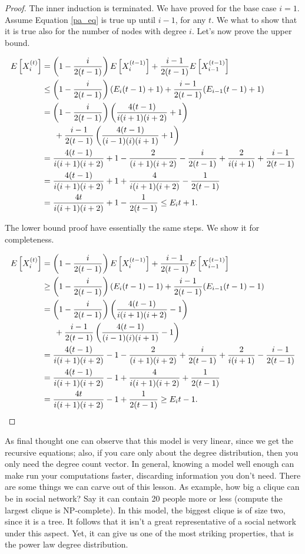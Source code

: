 \begin{proof}
The inner induction is terminated. We have proved for the base case $i = 1$. Assume Equation \ref{pa_eq} is true up until $i-1$, for any $t$. We what to show that it is true also for the number of nodes with degree $i$. Let's now prove the upper bound.

\begin{align}
\E{X_i^{(t)}} &= \left(1-\frac{i}{2(t-1)}\right)\E{X_i^{(t-1)}} +\frac{i -1}{2(t-1)}\E{X_{i-1}^{(t-1)}}\\
&\leq \left(1-\frac{i}{2(t-1)}\right)(E_i(t-1)+1) +\frac{i -1}{2(t-1)}(E_{i-1}(t-1)+1)\\
&=\left(1-\frac{i}{2(t-1)}\right)\left(\frac{4(t-1)}{i(i+1)(i+2)}+1\right)\\
&\indent+\frac{i -1}{2(t-1)}\left(\frac{4(t-1)}{(i-1)(i)(i+1)}+1\right)\\
&=\frac{4(t-1)}{i(i+1)(i+2)} + 1 -\frac{2}{(i+1)(i+2)} -\frac{i}{2(t-1)} + \frac{2}{i(i+1)} + \frac{i-1}{2(t-1)}\\
&=\frac{4(t-1)}{i(i+1)(i+2)} + 1 +\frac{4}{i(i+1)(i+2)} -\frac{1}{2(t-1)}\\
&=\frac{4t}{i(i+1)(i+2)} + 1 -\frac{1}{2(t-1)} \leq E_it+1.
\end{align}

The lower bound proof have essentially the same steps. We show it for completeness.

\begin{align}
\E{X_i^{(t)}} &= \left(1-\frac{i}{2(t-1)}\right)\E{X_i^{(t-1)}} +\frac{i -1}{2(t-1)}\E{X_{i-1}^{(t-1)}}\\
&\geq \left(1-\frac{i}{2(t-1)}\right)(E_i(t-1)-1) +\frac{i -1}{2(t-1)}(E_{i-1}(t-1)-1)\\
&=\left(1-\frac{i}{2(t-1)}\right)\left(\frac{4(t-1)}{i(i+1)(i+2)}-1\right)\\
&\indent+\frac{i -1}{2(t-1)}\left(\frac{4(t-1)}{(i-1)(i)(i+1)}-1\right)\\
&=\frac{4(t-1)}{i(i+1)(i+2)} -1 -\frac{2}{(i+1)(i+2)} +\frac{i}{2(t-1)} + \frac{2}{i(i+1)} - \frac{i-1}{2(t-1)}\\
&=\frac{4(t-1)}{i(i+1)(i+2)} -1 +\frac{4}{i(i+1)(i+2)} +\frac{1}{2(t-1)}\\
&=\frac{4t}{i(i+1)(i+2)} -1 +\frac{1}{2(t-1)} \geq E_it-1.
\end{align}
\end{proof}

As final thought one can observe that this model is very linear, since we get the recursive equations; also, if you care only about the degree distribution, then you only need the degree count vector. In general, knowing a model well enough can make run your computations faster, discarding information you don't need. There are some things we can carve out of this lesson. As example, how big a clique can be in social network? Say it can contain 20 people more or less (compute the largest clique is NP-complete). In this model, the biggest clique is of size two, since it is a tree. It follows that it isn't a great representative of a social network under this aspect. Yet, it can give us one of the most striking properties, that is the power law degree distribution.

